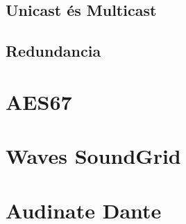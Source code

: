 \subsection{Unicast és Multicast}

\subsection{Redundancia}

\section{AES67}

\section{Waves SoundGrid}


\section{Audinate Dante}


